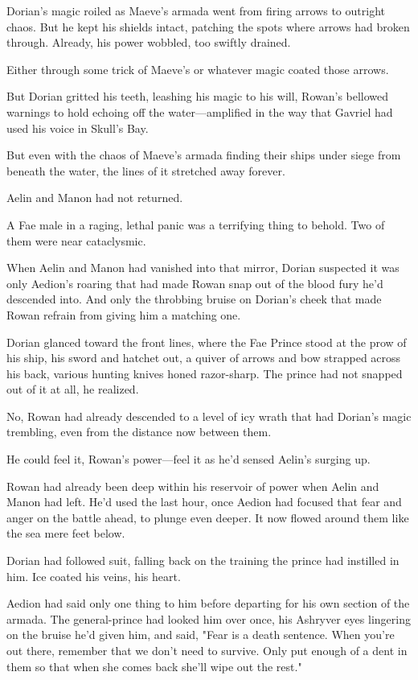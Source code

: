 Dorian's magic roiled as Maeve's armada went from firing arrows to outright chaos. But he kept his shields intact, patching the spots where arrows had broken through. Already, his power wobbled, too swiftly drained.

Either through some trick of Maeve's or whatever magic coated those arrows.

But Dorian gritted his teeth, leashing his magic to his will, Rowan's bellowed warnings to hold echoing off the water---amplified in the way that Gavriel had used his voice in Skull's Bay.

But even with the chaos of Maeve's armada finding their ships under siege from beneath the water, the lines of it stretched away forever.

Aelin and Manon had not returned.

A Fae male in a raging, lethal panic was a terrifying thing to behold. Two of them were near cataclysmic.

When Aelin and Manon had vanished into that mirror, Dorian suspected it was only Aedion's roaring that had made Rowan snap out of the blood fury he'd descended into. And only the throbbing bruise on Dorian's cheek that made Rowan refrain from giving him a matching one.

Dorian glanced toward the front lines, where the Fae Prince stood at the prow of his ship, his sword and hatchet out, a quiver of arrows and bow strapped across his back, various hunting knives honed razor-sharp. The prince had not snapped out of it at all, he realized.

No, Rowan had already descended to a level of icy wrath that had Dorian's magic trembling, even from the distance now between them.

He could feel it, Rowan's power---feel it as he'd sensed Aelin's surging up.

Rowan had already been deep within his reservoir of power when Aelin and Manon had left. He'd used the last hour, once Aedion had focused that fear and anger on the battle ahead, to plunge even deeper. It now flowed around them like the sea mere feet below.

Dorian had followed suit, falling back on the training the prince had instilled in him. Ice coated his veins, his heart.

Aedion had said only one thing to him before departing for his own section of the armada. The general-prince had looked him over once, his Ashryver eyes lingering on the bruise he'd given him, and said, "Fear is a death sentence. When you're out there, remember that we don't need to survive. Only put enough of a dent in them so that when she comes back  she'll wipe out the rest."


